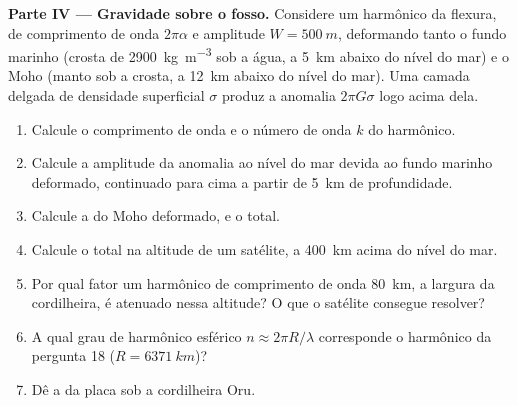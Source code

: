 \begin{problem}
\noindent\textbf{Parte IV --- Gravidade sobre o fosso.} Considere um harmônico da
flexura, de comprimento de onda $2\pi\alpha$ e amplitude $W = \qty{500}{m}$, deformando
tanto o fundo marinho (crosta de \qty{2900}{kg.m^{-3}} sob a água, a \qty{5}{km} abaixo
do nível do mar) e o Moho (manto sob a crosta, a \qty{12}{km} abaixo do nível do mar). Uma
camada delgada de densidade superficial $\sigma$ produz a anomalia $2\pi G\sigma$
logo acima dela.
\begin{enumerate}[resume]
  \item Calcule o comprimento de onda e o número de onda $k$ do harmônico.
  \item Calcule a amplitude da anomalia ao nível do mar devida ao fundo marinho
        deformado, continuado para cima a partir de \qty{5}{km} de profundidade.
  \item Calcule a do Moho deformado, e o total.
  \item Calcule o total na altitude de um satélite, a \qty{400}{km} acima do nível do
        mar.
  \item Por qual fator um harmônico de comprimento de onda \qty{80}{km}, a largura da
        cordilheira, é atenuado nessa altitude? O que o satélite consegue resolver?
  \item A qual grau de harmônico esférico $n \approx 2\pi R/\lambda$ corresponde o
        harmônico da pergunta 18 ($R = \qty{6371}{km}$)?
  \item Dê a  da placa sob a
        cordilheira Oru.
\end{enumerate}
\end{problem}

